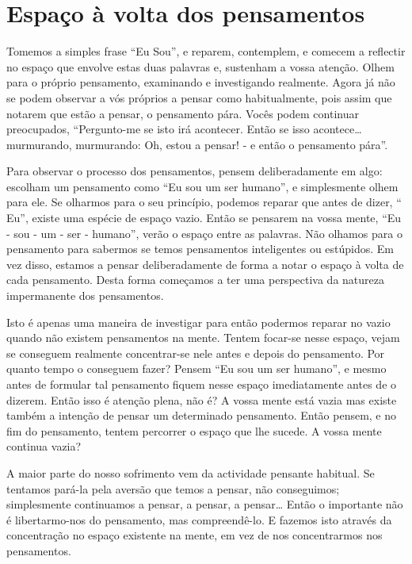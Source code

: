 \section{Espaço à volta dos pensamentos}

Tomemos a simples frase ``Eu Sou'', e reparem, contemplem, e comecem a
reflectir no espaço que envolve estas duas palavras e, sustenham a vossa
atenção. Olhem para o próprio pensamento, examinando e investigando
realmente. Agora já não se podem observar a vós próprios a pensar como
habitualmente, pois assim que notarem que estão a pensar, o pensamento
pára. Vocês podem continuar preocupados, ``Pergunto-me se isto irá
acontecer. Então se isso acontece\ldots{} murmurando, murmurando: Oh, estou a
pensar! - e então o pensamento pára''.

Para observar o processo dos pensamentos, pensem deliberadamente em
algo: escolham um pensamento como ``Eu sou um ser humano'', e
simplesmente olhem para ele. Se olharmos para o seu princípio, podemos
reparar que antes de dizer, `` Eu'', existe uma espécie de espaço vazio.
Então se pensarem na vossa mente, ``Eu - sou - um - ser - humano'',
verão o espaço entre as palavras. Não olhamos para o pensamento para
sabermos se temos pensamentos inteligentes ou estúpidos. Em vez disso,
estamos a pensar deliberadamente de forma a notar o espaço à volta de
cada pensamento. Desta forma começamos a ter uma perspectiva da natureza
impermanente dos pensamentos.

Isto é apenas uma maneira de investigar para então podermos reparar no
vazio quando não existem pensamentos na mente. Tentem focar-se nesse
espaço, vejam se conseguem realmente concentrar-se nele antes e depois
do pensamento. Por quanto tempo o conseguem fazer? Pensem ``Eu sou um
ser humano'', e mesmo antes de formular tal pensamento fiquem nesse
espaço imediatamente antes de o dizerem. Então isso é atenção plena, não
é? A vossa mente está vazia mas existe também a intenção de pensar um
determinado pensamento. Então pensem, e no fim do pensamento, tentem
percorrer o espaço que lhe sucede. A vossa mente continua vazia?

A maior parte do nosso sofrimento vem da actividade pensante habitual.
Se tentamos pará-la pela aversão que temos a pensar, não conseguimos;
simplesmente continuamos a pensar, a pensar, a pensar\ldots{} Então o
importante não é libertarmo-nos do pensamento, mas compreendê-lo. E
fazemos isto através da concentração no espaço existente na mente, em
vez de nos concentrarmos nos pensamentos.

